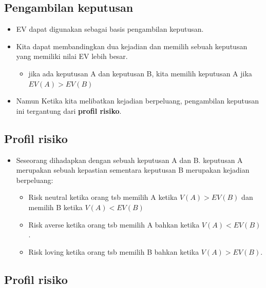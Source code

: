 \documentclass[
  letterpaper,
  DIV=11,
  numbers=noendperiod]{scrartcl}
\providecommand{\tightlist}{%
  \setlength{\itemsep}{0pt}\setlength{\parskip}{0pt}}\usepackage{longtable,booktabs,array}
\begin{document}
\subsection{Pengambilan keputusan}\label{pengambilan-keputusan}

\begin{itemize}
\item
  EV dapat digunakan sebagai basis pengambilan keputusan.
\item
  Kita dapat membandingkan dua kejadian dan memilih sebuah keputusan
  yang memiliki nilai EV lebih besar.

  \begin{itemize}
  \tightlist
  \item
    jika ada keputusan A dan keputusan B, kita memilih keputusan A jika
    \(EV(A) > EV(B)\)
  \end{itemize}
\item
  Namun Ketika kita melibatkan kejadian berpeluang, pengambilan
  keputusan ini tergantung dari \textbf{profil risiko}.
\end{itemize}

\subsection{Profil risiko}\label{profil-risiko}

\begin{itemize}
\item
  Seseorang dihadapkan dengan sebuah keputusan A dan B. keputusan A
  merupakan sebuah kepastian sementara keputusan B merupakan kejadian
  berpeluang:

  \begin{itemize}
  \item
    Risk neutral ketika orang tsb memilih A ketika \(V(A)>EV(B)\) dan
    memilih B ketika \(V(A)<EV(B)\)
  \item
    Risk averse ketika orang tsb memilih A bahkan ketika \(V(A)<EV(B)\).
  \item
    Risk loving ketika orang tsb memilih B bahkan ketika \(V(A)>EV(B)\).
  \end{itemize}
\end{itemize}

\subsection{Profil risiko}\label{profil-risiko-1}
\end{document}
